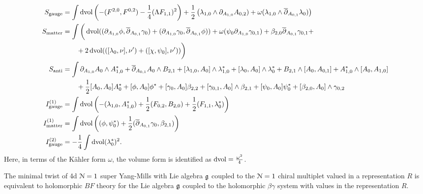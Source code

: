\documentclass[10pt, oneside]{article}
\begin{document}
\begin{align*}
S_{\mathrm{gauge}} &= \int \operatorname{dvol} \left(-(F^{2, 0}, F^{0, 2}) - \frac{1}{4}(\Lambda F_{1, 1})^2\right) + \frac 12 \left(\lambda_{1,0} \wedge \partial_{A_{1,0}} A_{0,2}) + \omega (\lambda_{1,0} \wedge \overline{\partial}_{A_{0,1}} \lambda_0) \right)  \\
S_{\mathrm{matter}} &= \int \bigg( \operatorname{dvol} ((\partial_{A_{1,0}}\phi , \overline{\partial}_{A_{0,1}} \gamma_0) + (\partial_{A_{1,0}}\gamma_0, \overline{\partial}_{A_{0,1}} \phi)) + \omega (\psi_0 \partial_{A_{1,0}} \gamma_{0,1}) + \beta_{2,0} \overline{\partial}_{A_{0,1}} \gamma_{0,1}  + \\
&\qquad + 2\operatorname{dvol}(([\lambda_0,\nu],\nu') + ([\chi, \psi_0], \nu') )   \bigg) \\
S_{\mathrm{anti}} &= \int \partial_{A_{1, 0}} A_0 \wedge A_{1,0}^* + \overline{\partial}_{A_{0, 1}} A_0\wedge B_{2,1} + [\lambda_{1,0}, A_0]\wedge \lambda_{1,0}^* +  [\lambda_{0}, A_0]\wedge \lambda_{0}^* +B_{2,1} \wedge [A_0, A_{0,1}] + A_{1,0}^* \wedge [A_{0}, A_{1,0}] \\
&\qquad + \frac{1}{2}[A_0, A_0]A_0^* + [\phi, A_0] \phi^* + [\gamma_0, A_0] \beta_{2,2} + [\gamma_{0,1}, A_0]\wedge \beta_{2,1} + [\psi_0, A_0] \psi_0^* + [\beta_{2,0}, A_0] \wedge \gamma_{0,2} \\
I^{(1)}_{\mathrm{gauge}} &=  \int \operatorname{dvol} \left( - (\lambda_{1,0}, A_{1,0}^*) + \frac 12 (F_{0,2},B_{2,0}) + \frac 12 (F_{1,1}, \lambda_0^*)  \right)\\
I^{(1)}_{\mathrm{matter}} &=  \int \operatorname{dvol} \left( (\phi, \psi_0^*) + \frac 12( \overline{\partial}_{A_{0,1}} \gamma_{0}, \beta_{2,1}) \right)\\
I^{(2)}_{\mathrm{gauge}} &= -\frac{1}{4}\int \operatorname{dvol} (\lambda_0^*)^2.
\end{align*}
Here, in terms of the K\"ahler form $\omega$, the volume form is identified as $\operatorname{dvol} = \frac{\omega^2}4$.

\begin{prop}
The minimal twist of 4d $\mathcal N=1$ super Yang-Mills with Lie algebra $\mathfrak g$ coupled to the $\mathcal N=1$ chiral multiplet valued in a representation $R$ is equivalent to holomorphic $BF$ theory for the Lie algebra $\mathfrak g$ coupled to the holomorphic $\beta\gamma$ system with values in the representation $R$. 
\end{prop}
\end{document}
